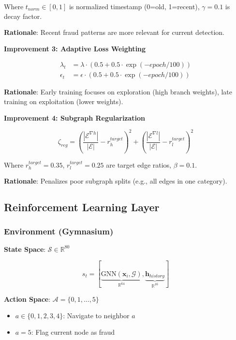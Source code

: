 \documentclass[11pt,a4paper]{article}
\begin{document}
Where $t_{norm} \in [0,1]$ is normalized timestamp (0=old, 1=recent), $\gamma=0.1$ is decay factor.

\textbf{Rationale}: Recent fraud patterns are more relevant for current detection.

\textbf{Improvement 3: Adaptive Loss Weighting}

\begin{align}
\lambda_t &= \lambda \cdot \left(0.5 + 0.5 \cdot \exp(-epoch/100)\right) \\
\epsilon_t &= \epsilon \cdot \left(0.5 + 0.5 \cdot \exp(-epoch/100)\right)
\end{align}

\textbf{Rationale}: Early training focuses on exploration (high branch weights), late training on exploitation (lower weights).

\textbf{Improvement 4: Subgraph Regularization}

\begin{equation}
\zeta_{reg} = \left(\frac{|\mathcal{E}^{\nabla h}|}{|\mathcal{E}|} - r_h^{target}\right)^2 + \left(\frac{|\mathcal{E}^{\nabla l}|}{|\mathcal{E}|} - r_l^{target}\right)^2
\end{equation}

Where $r_h^{target}=0.35$, $r_l^{target}=0.25$ are target edge ratios, $\beta=0.1$.

\textbf{Rationale}: Penalizes poor subgraph splits (e.g., all edges in one category).

\subsection{Reinforcement Learning Layer}

\subsubsection{Environment (Gymnasium)}

\textbf{State Space}: $\mathcal{S} \in \mathbb{R}^{80}$

\begin{equation}
s_t = [\underbrace{\text{GNN}(\mathbf{x}_i, \mathcal{G})}_{\mathbb{R}^{64}}, \underbrace{\mathbf{h}_{history}}_{\mathbb{R}^{16}}]
\end{equation}

\textbf{Action Space}: $\mathcal{A} = \{0, 1, ..., 5\}$
\begin{itemize}
    \item $a \in \{0, 1, 2, 3, 4\}$: Navigate to neighbor $a$
    \item $a = 5$: Flag current node as fraud
\end{itemize}
\end{document}

